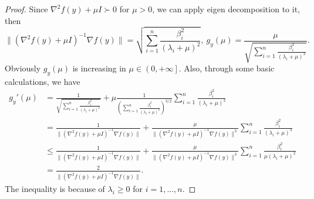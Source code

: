 \documentclass{mcom-l}
\numberwithin{equation}{section}
\begin{document}
\begin{proof}
    Since $\nabla^2 f(y)+\mu I \succ 0$ for $\mu>0$, we can apply eigen decomposition to it, then
    \begin{equation*}
        \|\left (\nabla ^2 f(y)+\mu I \right)^{-1}\nabla f(y)\|=\sqrt{\sum_{i=1}^n \frac{\beta_i^2}{\left (\lambda_i+\mu\right )^2}}, \ g_y(\mu) = \frac{\mu}{\sqrt{\sum_{i=1}^n \frac{\beta_i^2}{\left (\lambda_i+\mu\right )^2}}}.
    \end{equation*}
    Obviously $g_y(\mu)$ is increasing in $\mu \in \left (0,+\infty\right ]$. Also, through some basic calculations, we have
    \begin{equation*}
        \begin{aligned}
            g_y'(\mu) & = \frac{1}{\sqrt{\sum_{i=1}^n \frac{\beta_i^2}{\left (\lambda_i+\mu\right )^2}}}+\mu \frac{1}{\left ( \sum_{i=1}^n \frac{\beta_i^2}{\left (\lambda_i+\mu\right )^2}\right )^{3/2}}\sum_{i=1}^n\frac{\beta_i^2}{\left (\lambda_i+\mu\right )^3} \\
                      & = \frac{1}{\|\left (\nabla ^2 f(y)+\mu I \right)^{-1}\nabla f(y)\|}+\frac{\mu}{\|\left (\nabla ^2 f(y)+\mu I \right)^{-1}\nabla f(y)\|^3}\sum_{i=1}^n\frac{\beta_i^2}{\left (\lambda_i+\mu\right )^3}                                          \\
                      & \leq \frac{1}{\|\left (\nabla ^2 f(y)+\mu I \right)^{-1}\nabla f(y)\|}+\frac{\mu}{\|\left (\nabla ^2 f(y)+\mu I \right)^{-1}\nabla f(y)\|^3}\sum_{i=1}^n\frac{\beta_i^2}{\mu\left (\lambda_i+\mu\right )^2}                                    \\
                      & =  \frac{2}{\|\left (\nabla ^2 f(y)+\mu I \right)^{-1}\nabla f(y)\|}.
        \end{aligned}
    \end{equation*}
    The inequality is because of $\lambda_i \geq 0$ for $i=1,\ldots,n$.
\end{proof}
\end{document}
